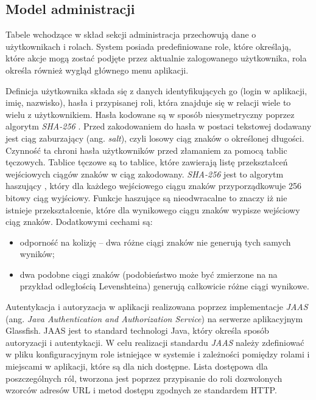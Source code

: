  
  
\subsection{Model administracji}  


Tabele wchodzące w skład sekcji administracja przechowują dane o użytkownikach i rolach. System posiada predefiniowane role, które określają, które akcje mogą zostać podjęte przez aktualnie zalogowanego użytkownika, rola określa również wygląd głównego menu aplikacji.

Definicja użytkownika składa się z danych identyfikujących go (login w aplikacji, imię, nazwisko), hasła i przypisanej roli, która znajduje się w relacji wiele to wielu z użytkownikiem. Hasła kodowane są w sposób niesymetryczny poprzez algorytm \textit{SHA-256} \cite{sha2}. Przed zakodowaniem do hasła w postaci tekstowej dodawany jest ciąg zaburzający (ang. \textit{salt}), czyli losowy ciąg znaków o określonej długości. Czynność ta chroni hasła użytkowników przed złamaniem za pomocą tablic tęczowych. Tablice tęczowe są to tablice, które zawierają listę przekształceń wejściowych ciągów znaków w ciąg zakodowany. \textit{SHA-256} jest to algorytm haszujący \cite{hash}, który dla każdego wejściowego ciągu znaków przyporządkowuje 256 bitowy ciąg wyjściowy. Funkcje haszujące są nieodwracalne to znaczy iż nie istnieje przekształcenie, które dla wynikowego ciągu znaków wypisze wejściowy ciąg znaków. Dodatkowymi cechami są:
\begin{itemize}
  \item  odporność na kolizję --  dwa różne ciągi znaków nie generują tych samych wyników;
  \item dwa podobne ciągi znaków (podobieństwo może być zmierzone na na przykład odległością Levenshteina\cite{Levenshtein}) generują całkowicie różne ciągi wynikowe.
\end{itemize}

Autentykacja i autoryzacja w aplikacji realizowana poprzez implementacje \textit{JAAS}\cite{jaas} (ang. \textit{Java Authentication and Authorization Service}) na serwerze aplikacyjnym Glassfish. JAAS jest to standard technologi Java, który określa sposób autoryzacji i autentykacji. W celu realizacji standardu \textit{JAAS} należy zdefiniować w pliku konfiguracyjnym role istniejące w systemie i zależności pomiędzy rolami i miejscami w aplikacji, które są dla nich dostępne. Lista dostępowa dla poszczególnych ról, tworzona jest poprzez przypisanie do roli dozwolonych wzorców adresów URL i metod dostępu zgodnych ze standardem HTTP.

